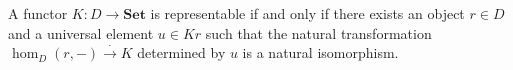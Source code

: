 A functor $K: D \rightarrow \mathbf{Set}$ is representable if and only if there exists an object $r \in D$ and a universal element $u \in Kr$ such that the natural transformation $\hom_D(r, -) \xrightarrow{\cdot} K$ determined by $u$ is a natural isomorphism.